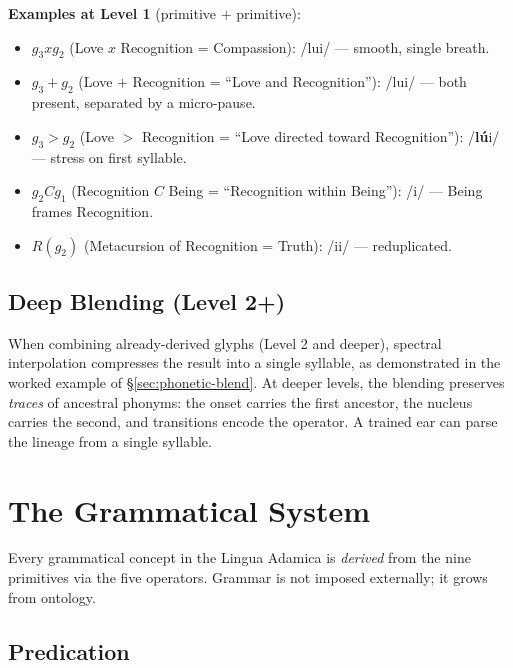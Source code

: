 \documentclass[12pt, letterpaper]{book}
\def\otimes{x}%
\def\oplus{+}%
\def\triangleright{>}%
\def\subset{C}%
\def\circlearrowleft{R}%
\def\mathfrak#1{#1}%
\begin{document}
\noindent\textbf{Examples at Level 1} (primitive $+$ primitive):

\begin{itemize}
    \item $\mathfrak{g}_3 \otimes \mathfrak{g}_2$ (Love $\otimes$ Recognition = Compassion): /lu\textesh i/ --- smooth, single breath.
    \item $\mathfrak{g}_3 \oplus \mathfrak{g}_2$ (Love $\oplus$ Recognition = ``Love and Recognition''): /lu\textperiodcentered\textesh i/ --- both present, separated by a micro-pause.
    \item $\mathfrak{g}_3 \triangleright \mathfrak{g}_2$ (Love $\triangleright$ Recognition = ``Love directed toward Recognition''): /\textbf{l\'u}\textesh i/ --- stress on first syllable.
    \item $\mathfrak{g}_2 \subset \mathfrak{g}_1$ (Recognition $\subset$ Being = ``Recognition within Being''): /\textscripta\textesh i\textscripta/ --- Being frames Recognition.
    \item $\circlearrowleft(\mathfrak{g}_2)$ (Metacursion of Recognition = Truth): /\textesh i\textesh i/ --- reduplicated.
\end{itemize}

\subsection{Deep Blending (Level 2+)}

When combining already-derived glyphs (Level 2 and deeper), spectral interpolation compresses the result into a single syllable, as demonstrated in the worked example of \S\ref{sec:phonetic-blend}. At deeper levels, the blending preserves \textit{traces} of ancestral phonyms: the onset carries the first ancestor, the nucleus carries the second, and transitions encode the operator. A trained ear can parse the lineage from a single syllable.

\section{The Grammatical System}

Every grammatical concept in the Lingua Adamica is \textit{derived} from the nine primitives via the five operators. Grammar is not imposed externally; it grows from ontology.

\subsection{Predication}
\end{document}
